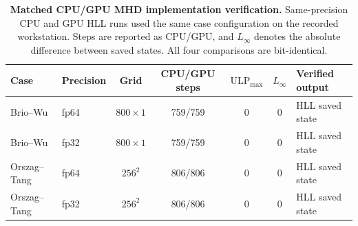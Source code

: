 \begin{table}[htbp]
\centering
\small
\begin{tabularx}{\textwidth}{@{}llccccX@{}}
\toprule
Case & Precision & Grid & CPU/GPU steps & $\mathrm{ULP}_{\max}$ & $L_\infty$ & Verified output \\
\midrule \addlinespace[2pt]
Brio--Wu & fp64 & $800\times1$ & 759/759 & 0 & 0 & HLL saved state \\
Brio--Wu & fp32 & $800\times1$ & 759/759 & 0 & 0 & HLL saved state \\
Orszag--Tang & fp64 & $256^2$ & 806/806 & 0 & 0 & HLL saved state \\
Orszag--Tang & fp32 & $256^2$ & 806/806 & 0 & 0 & HLL saved state \\
\bottomrule
\end{tabularx}
\caption[Matched CPU/GPU MHD implementation verification]{\textbf{Matched CPU/GPU MHD implementation verification.} Same-precision CPU and GPU HLL runs used the same case configuration on the recorded workstation. Steps are reported as CPU/GPU, and $L_\infty$ denotes the absolute difference between saved states. All four comparisons are bit-identical.}
\label{tab:ch4-cpu-gpu}
\end{table}
